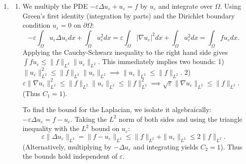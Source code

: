 \documentclass[10pt,a4paper]{article}
\begin{document}
\begin{enumerate}[label=\fbox{\arabic*}]
  \item %
        \begin{enumerate}[label=(\roman*)]
          \item We multiply the PDE $-\varepsilon \Delta u_\varepsilon + u_\varepsilon = f$ by $u_\varepsilon$ and integrate over $\Omega$. Using Green's first identity (integration by parts) and the Dirichlet boundary condition $u_\varepsilon = 0$ on $\partial\Omega$:
          \[
            -\varepsilon \int_\Omega u_\varepsilon \Delta u_\varepsilon dx + \int_\Omega u_\varepsilon^2 dx = \varepsilon \int_\Omega |\nabla u_\varepsilon|^2 dx + \int_\Omega u_\varepsilon^2 dx = \int_\Omega f u_\varepsilon dx.
          \]
          Applying the Cauchy-Schwarz inequality to the right hand side gives $\int f u_\varepsilon \le \|f\|_{L^2} \|u_\varepsilon\|_{L^2}$. This immediately implies two bounds:
          1) $\|u_\varepsilon\|_{L^2}^2 \le \|f\|_{L^2} \|u_\varepsilon\|_{L^2} \implies \|u_\varepsilon\|_{L^2} \le \|f\|_{L^2}$.
          2) $\varepsilon \|\nabla u_\varepsilon\|_{L^2}^2 \le \|f\|_{L^2} \|u_\varepsilon\|_{L^2} \le \|f\|_{L^2}^2 \implies \sqrt{\varepsilon} \|\nabla u_\varepsilon\|_{L^2} \le \|f\|_{L^2}$. (Thus $C_1 = 1$).
          
          To find the bound for the Laplacian, we isolate it algebraically: $-\varepsilon \Delta u_\varepsilon = f - u_\varepsilon$.
          Taking the $L^2$ norm of both sides and using the triangle inequality with the $L^2$ bound on $u_\varepsilon$:
          \[
            \varepsilon \|\Delta u_\varepsilon\|_{L^2} = \|f - u_\varepsilon\|_{L^2} \le \|f\|_{L^2} + \|u_\varepsilon\|_{L^2} \le 2\|f\|_{L^2}.
          \]
          (Alternatively, multiplying by $-\Delta u_\varepsilon$ and integrating yields $C_2 = 1$). Thus the bounds hold independent of $\varepsilon$.


\end{enumerate}
\end{enumerate}
\end{document}
